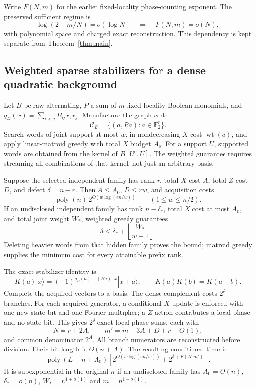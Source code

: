 \documentclass[11pt]{article}
\theoremstyle{remark}\newtheorem{remark}[theorem]{Remark}
\newcommand{\F}{\mathbb F}
\newcommand{\poly}{\operatorname{poly}}
\newcommand{\wt}{\operatorname{wt}}
\begin{document}
Write $F(N,m)$ for the earlier fixed-locality phase-counting exponent. The preserved sufficient regime is
\[
 \log(2+m/N)=o(\log N)\quad\Longrightarrow\quad F(N,m)=o(N),
\]
with polynomial space and charged exact reconstruction. This dependency is kept separate from Theorem~\ref{thm:main}.

\subsection{Weighted sparse stabilizers for a dense quadratic background}
Let $B$ be raw alternating, $P$ a sum of $m$ fixed-locality Boolean monomials, and $q_B(x)=\sum_{i<j}B_{ij}x_ix_j$. Manufacture the graph code
\[
 \mathcal C_B=\{(a,Ba):a\in\F_2^n\}.
\]
Search words of joint support at most $w$, in nondecreasing $X$ cost $\wt(a)$, and apply linear-matroid greedy with total $X$ budget $A_0$. For a support $U$, supported words are obtained from the kernel of $B[U^c,U]$. The weighted guarantee requires streaming all combinations of that kernel, not just an arbitrary basis.

Suppose the selected independent family has rank $r$, total $X$ cost $A$, total $Z$ cost $D$, and defect $\delta=n-r$. Then $A\le A_0$, $D\le rw$, and acquisition costs
\[
 \poly(n)\,2^{O(w\log(en/w))}\qquad(1\le w\le n/2).
\]
If an undisclosed independent family has rank $n-\delta_*$, total $X$ cost at most $A_0$, and total joint weight $W_*$, weighted greedy guarantees
\[
 \delta\le\delta_*+\left\lfloor\frac{W_*}{w+1}\right\rfloor.
\]
Deleting heavier words from that hidden family proves the bound; matroid greedy supplies the minimum cost for every attainable prefix rank.

The exact stabilizer identity is
\[
 K(a)|x\rangle=(-1)^{q_B(a)+(Ba)\cdot x}|x+a\rangle,
 \qquad K(a)K(b)=K(a+b).
\]
Complete the acquired vectors to a basis. The dense complement costs $2^\delta$ branches. For each acquired generator, a conditional $X$ update is enforced with one new state bit and one Fourier multiplier; a $Z$ action contributes a local phase and no state bit. This gives $2^\delta$ exact local phase sums, each with
\[
 N=r+2A,\qquad m'=m+3A+D+r+O(1),
\]
and common denominator $2^A$. All branch numerators are reconstructed before division. Their bit length is $O(n+A)$. The resulting conditional time is
\[
 \poly(L+n+A_0)\left[2^{O(w\log(en/w))}
 +2^{\delta+F(N,m')}\right].
\]
It is subexponential in the original $n$ if an undisclosed family has $A_0=O(n)$, $\delta_*=o(n)$, $W_*=n^{1+o(1)}$ and $m=n^{1+o(1)}$.
\end{document}
